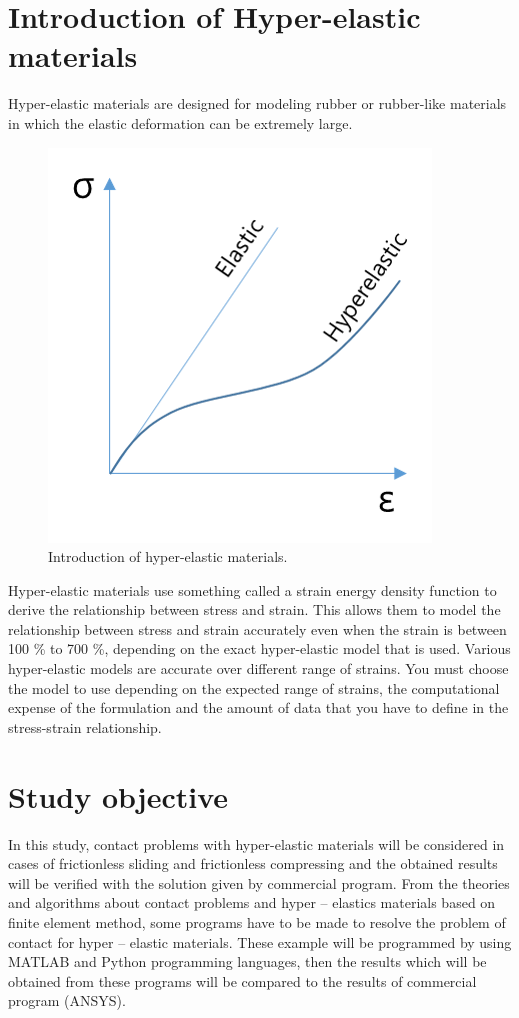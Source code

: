 
\section{ Introduction of Hyper-elastic materials}
Hyper-elastic materials are designed for modeling rubber or rubber-like materials in which the elastic deformation can be extremely large. 

\begin{figure}[H]
    \centering
    \includegraphics[scale=1]{Figures/Hyperelastic.png}
    \decoRule   
    \caption{ Introduction of hyper-elastic materials.}
    \label{fig:Electron}
\end{figure}
Hyper-elastic materials use something called a strain energy density function to derive the relationship between stress and strain. This allows them to model the relationship between stress and strain accurately even when the strain is between 100 \% to 700 \%, depending on the exact hyper-elastic model that is used.
Various hyper-elastic models are accurate over different range of strains. You must choose the model to use depending on the expected range of strains, the computational expense of the formulation and the amount of data that you have to define in the stress-strain relationship.

\section{Study objective}
In this study, contact problems with hyper-elastic materials will be considered in cases of frictionless sliding and frictionless compressing and the obtained results will be verified with the solution given by commercial program. From the theories and algorithms about contact problems and hyper – elastics materials based on finite element method, some
programs have to be made to resolve the problem of contact for hyper – elastic materials. These example will be programmed by using MATLAB and Python programming
languages, then the results which will be obtained from these programs will be compared to the results of commercial program (ANSYS).


